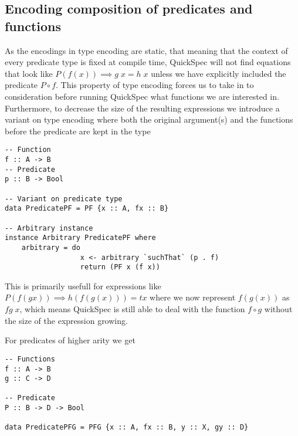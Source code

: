 \subsection{Encoding composition of predicates and functions}
As the encodings in type encoding are static, that meaning
that the context of every predicate type is fixed
at compile time, QuickSpec will not find equations
that look like $P(f(x))\implies g\;x=h\;x$
unless we have explicitly included the 
predicate $P \circ f$. This property of type encoding
forces us to take in to consideration before running QuickSpec
what functions we are interested in. 
Furthermore, to decrease the size of the resulting expressions we introduce
a variant on type encoding where both the original argument(s) and the
functions before the predicate are kept in the type
\begin{verbatim}
-- Function
f :: A -> B
-- Predicate
p :: B -> Bool

-- Variant on predicate type
data PredicatePF = PF {x :: A, fx :: B}

-- Arbitrary instance
instance Arbitrary PredicatePF where
    arbitrary = do
                  x <- arbitrary `suchThat` (p . f)
                  return (PF x (f x))

\end{verbatim}
This is primarily usefull for expressions like $P (f (g x))\implies h(f(g(x))) = t x$
where we now represent $f(g(x))$ as $fg\;x$, which means QuickSpec is still able to
deal with the function $f\circ g$ without the size of the expression growing.

For predicates of higher arity we get
\begin{verbatim}
-- Functions
f :: A -> B
g :: C -> D

-- Predicate
P :: B -> D -> Bool

data PredicatePFG = PFG {x :: A, fx :: B, y :: X, gy :: D}
\end{verbatim}

